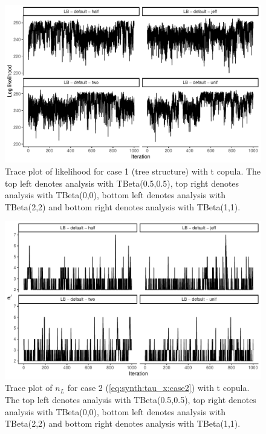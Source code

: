 \documentclass{amsart}
\begin{document}
\begin{figure}
	\centering
	\includegraphics[width = 0.75\linewidth]{trace_case1_t_like.pdf}
	\caption{Trace plot of likelihood for case 1 (tree structure) with t copula. The top left denotes analysis with TBeta(0.5,0.5), top right denotes analysis with TBeta(0,0), bottom left denotes analysis with TBeta(2,2) and bottom right denotes analysis with TBeta(1,1).}
	\label{fig:case1:t:like}
\end{figure}

\begin{figure}
	\centering
	\includegraphics[width = 0.75\linewidth]{trace_case2_t_nterm.pdf}
	\caption{Trace plot of $n_L$ for case 2 (\cref{eq:synth:tau_x:case2}) with t copula. The top left denotes analysis with TBeta(0.5,0.5), top right denotes analysis with TBeta(0,0), bottom left denotes analysis with TBeta(2,2) and bottom right denotes analysis with TBeta(1,1).}
	\label{fig:case2:t:nterm}
\end{figure}
\end{document}
